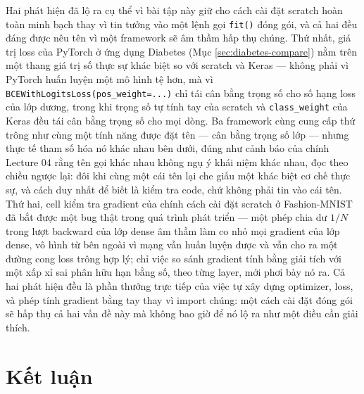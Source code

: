 \documentclass[11pt]{article}
\newcommand{\code}[1]{\texttt{#1}}
\begin{document}
Hai phát hiện đã lộ ra cụ thể vì bài tập này giữ cho cách cài đặt scratch
hoàn toàn minh bạch thay vì tin tưởng vào một lệnh gọi \code{fit()} đóng
gói, và cả hai đều đáng được nêu tên vì một framework sẽ âm thầm hấp thụ
chúng. Thứ nhất, giá trị loss của PyTorch ở ứng dụng Diabetes (Mục
\ref{sec:diabetes-compare}) nằm trên một thang giá trị số thực sự khác
biệt so với scratch và Keras — không phải vì PyTorch huấn luyện một mô
hình tệ hơn, mà vì \code{BCEWithLogitsLoss(pos\_weight=...)} chỉ tái cân
bằng trọng số cho số hạng loss của lớp dương, trong khi trọng số tự tính
tay của scratch và \code{class\_weight} của Keras đều tái cân bằng trọng
số cho mọi dòng. Ba framework cùng cung cấp thứ trông như cùng một tính
năng được đặt tên — cân bằng trọng số lớp — nhưng thực tế tham số hóa nó
khác nhau bên dưới, đúng như cảnh báo của chính Lecture 04 rằng tên gọi
khác nhau không ngụ ý khái niệm khác nhau, đọc theo chiều ngược lại: đôi
khi cùng một cái tên lại che giấu một khác biệt cơ chế thực sự, và cách
duy nhất để biết là kiểm tra code, chứ không phải tin vào cái tên. Thứ
hai, cell kiểm tra gradient của chính cách cài đặt scratch ở Fashion-MNIST
đã bắt được một bug thật trong quá trình phát triển — một phép chia dư
$1/N$ trong lượt backward của lớp dense âm thầm làm co nhỏ mọi gradient
của lớp dense, vô hình từ bên ngoài vì mạng vẫn huấn luyện được và vẫn cho
ra một đường cong loss trông hợp lý; chỉ việc so sánh gradient tính bằng
giải tích với một xấp xỉ sai phân hữu hạn bằng số, theo từng layer, mới
phơi bày nó ra. Cả hai phát hiện đều là phần thưởng trực tiếp của việc tự
xây dựng optimizer, loss, và phép tính gradient bằng tay thay vì import
chúng: một cách cài đặt đóng gói sẽ hấp thụ cả hai vấn đề này mà không bao
giờ để nó lộ ra như một điều cần giải thích.

\section{Kết luận}
\end{document}
